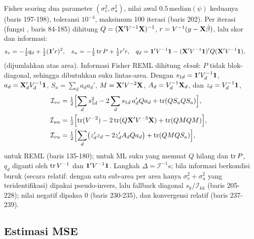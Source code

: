 Fisher scoring dua parameter $(\sigma_v^2,\sigma_u^2)$, nilai awal
$0.5\,\mathrm{median}(\psi)$ keduanya (baris 197-198), toleransi $10^{-4}$,
maksimum 100 iterasi (baris 202). Per iterasi (fungsi ,
baris 84-185) dihitung $Q=(\mathbf{X}'V^{-1}\mathbf{X})^{-1}$, $r=V^{-1}(y-\mathbf{X}\hat\beta)$,
lalu skor dan informasi:
\begin{align}
  s_v&=-\tfrac12 q_d+\tfrac12(\mathbf{1}'r)^2,
    & s_u&=-\tfrac12\operatorname{tr} P+\tfrac12 r'r,
    & q_d&=\mathbf{1}'V^{-1}\mathbf{1}-(\mathbf{X}'V^{-1}\mathbf{1})'Q(\mathbf{X}'V^{-1}\mathbf{1}),
    \label{eq:tf-score-reml}
\end{align}
(dijumlahkan atas area). Informasi Fisher REML dihitung \emph{eksak}: $P$
tidak blok-diagonal, sehingga dibutuhkan suku lintas-area. Dengan
$s_{1d}=\mathbf{1}'V_d^{-1}\mathbf{1}$, $a_d=\mathbf{X}_d'V_d^{-1}\mathbf{1}$,
$S_a=\sum_d a_da_d'$, $M=\mathbf{X}'V^{-2}\mathbf{X}$, $A_d=V_d^{-1}\mathbf{X}_d$, dan
$z_d=V_d^{-1}\mathbf{1}$,
\begin{align}
  \mathcal I_{vv}&=\tfrac12\Bigl[\sum_d s_{1d}^2-2\sum_d s_{1d}\,a_d'Qa_d
    +\operatorname{tr}(QS_aQS_a)\Bigr],\notag\\
  \mathcal I_{uu}&=\tfrac12\Bigl[\operatorname{tr}(V^{-2})-2\operatorname{tr}(Q\mathbf{X}'V^{-3}\mathbf{X})
    +\operatorname{tr}(QMQM)\Bigr],
  \label{eq:tf-info-reml}\\
  \mathcal I_{vu}&=\tfrac12\Bigl[\sum_d\bigl(z_d'z_d-2z_d'A_dQa_d\bigr)
    +\operatorname{tr}(QMQS_a)\Bigr],\notag
\end{align}
untuk REML (baris 135-180); untuk ML suku yang memuat $Q$ hilang dan
$\operatorname{tr} P$, $q_d$ diganti oleh $\operatorname{tr} V^{-1}$ dan $\mathbf{1}'V^{-1}\mathbf{1}$. Langkah
$\Delta=\mathcal I^{-1}s$; bila informasi berkondisi buruk (secara relatif:
dengan satu sub-area per area hanya $\sigma_v^2+\sigma_u^2$ yang
teridentifikasi) dipakai pseudo-invers, lalu fallback diagonal
$s_k/\mathcal I_{kk}$ (baris 205-228); nilai negatif dipaksa $0$ (baris
230-235), dan konvergensi relatif (baris 237-239).


\subsection{Estimasi MSE}\label{sec:twofold-mse}

